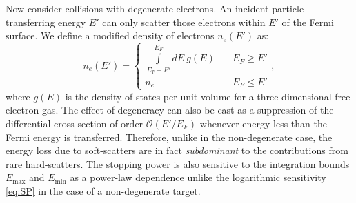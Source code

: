 \documentclass[twocolumn,showpacs,preprintnumbers,amsmath,amssymb,prd]{revtex4}
\begin{document}
\begin{appendices}
Now consider collisions with degenerate electrons.
An incident particle transferring energy $E'$ can only scatter those electrons within $E'$ of the Fermi surface.
We define a modified density of electrons $n_e(E')$ as:
\begin{equation}
\label{eq:pauliblocking}
n_e(E') = \left\{
        \begin{array}{ll}
            \displaystyle \int \limits_{E_F -E'}^{E_F}dE ~g(E) & \quad E_F \geq E' \\
            n_e & \quad E_F \leq E'
        \end{array}
    \right.,
\end{equation}
where $g(E)$ is the density of states per unit volume for a three-dimensional free electron gas.
The effect of degeneracy can also be cast as a suppression of the differential cross section of order $\mathcal{O}(E'/E_F)$ whenever energy less than the Fermi energy is transferred.
Therefore, unlike in the non-degenerate case, the energy loss due to soft-scatters are in fact \emph{subdominant} to the contributions from rare hard-scatters.
The stopping power is also sensitive to the integration bounds $E_{\text{max}}$ and $E_{\text{min}}$ as a power-law dependence unlike the logarithmic sensitivity \eqref{eq:SP} in the case of a non-degenerate target.


\end{appendices}
\end{document}
